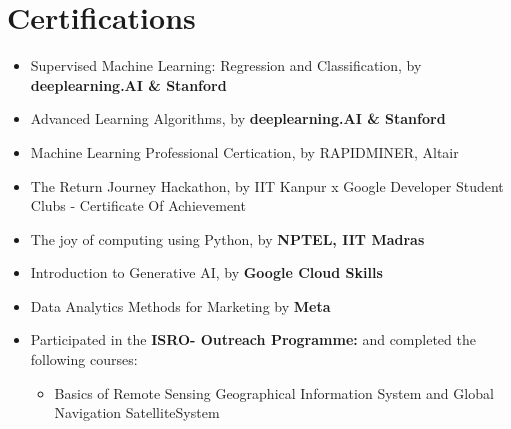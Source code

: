 \documentclass[10.8pt, a4paper]{extarticle}
\newcommand{\shorterSection}[1]{\vspace{-10pt}\section{#1}}
\begin{document}

\shorterSection{Certifications}
\begin{itemize}

\item Supervised Machine Learning: Regression and Classification, by \textbf{deeplearning.AI \& Stanford } \href{https://www.coursera.org/account/accomplishments/certificate/TECTFLUN93UC}{\faLink{}}\\[-0.6cm]

\item Advanced Learning Algorithms, by \textbf{deeplearning.AI \& Stanford } \href{https://www.coursera.org/account/accomplishments/certificate/PLNJXZ9JXVXJ}{\faLink{}}\\[-0.6cm]

\item Machine Learning Professional Certication, by RAPIDMINER, Altair \href{https://ti-user-certificates.s3.amazonaws.com/5733896a-1d71-46e5-b0a3-1ffcf845fe21/c270e7f8-c92a-4370-9507-4d8110f8ee23-souvik-mukherjee-c07e2e8a-577a-4baf-81ae-11aa76e694cd-certificate.pdf}{\faLink{}}\\[-0.6cm]

\item The Return Journey Hackathon, by IIT Kanpur x Google Developer Student Clubs - Certificate Of Achievement \href{https://drive.google.com/file/d/1J4PNmZKNsVgmEhSCm27sZNX8vNFhKZRA/view?usp=drive_link}{\faLink{}}\\[-0.6cm] 

\item The joy of computing using Python, by \textbf{NPTEL, IIT Madras }  \href{https://drive.google.com/file/d/1-0Q_gA_cl3bb7sPyZOA3OtV0fbmRLQvz/view?usp=sharing}{\faLink{}}\\[-0.6cm]

\item Introduction to Generative AI, by \textbf{Google Cloud Skills }\href{https://www.cloudskillsboost.google/public_profiles/76755a5d-f18b-4787-89db-bd6be0b3e066/badges/4178524}{\faLink{}}\\[-0.6cm]

\item Data Analytics Methods for Marketing by \textbf{Meta}\href{https://www.coursera.org/account/accomplishments/certificate/JPUQ5DJBDZN6}{\faLink{}}\\[-0.6cm]

\item Participated in the \textbf{ISRO- Outreach Programme:}  and completed the following courses: 
\begin{itemize}
    \item Basics of Remote Sensing Geographical Information System and Global Navigation SatelliteSystem \href{https://drive.google.com/file/d/15E-FXqYPGD-uRhFIRUu4WKobbqnBvlAh/view?usp=sharing}{\faLink{}}
    

\end{itemize}
\end{itemize}
\end{document}
